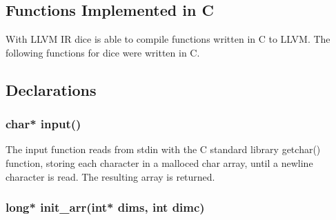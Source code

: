 \begin{homeworkProblem}
	\section{Functions Implemented in C}
    With LLVM IR dice is able to compile functions written in C to LLVM. The following functions for dice were written in C.
	
	\subsection{Declarations}
    \subsubsection{char* input()}
    The input function reads from stdin with the C standard library getchar() function, storing each character in a malloced char array, until a newline character is read. The resulting array is returned.
    \subsubsection{long* init_arr(int* dims, int dimc)}

\end{homeworkProblem}

